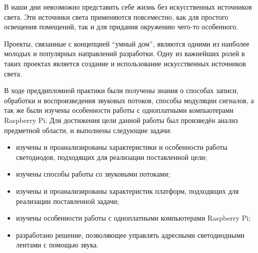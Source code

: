 \conclusion

В наши дни невозможно представить себе жизнь без искусственных источников света. Эти источники света применяются повсеместно, как для простого освещения помещений, так и для придания окружению чего-то особенного.

Проекты, связанные с концепцией ``умный дом'', являются одними из наиболее молодых и популярных направлений разработки. Одну из важнейших ролей в таких проектах является создание и использование искусственных источников света.

В ходе преддипломной практики были получены знания о способах записи, обработки и воспроизведения звуковых потоков, способы модуляции сигналов, а так же были изучены особенности работы с одноплатными компьютерами Raspberry Pi. Для достижения цели данной работы был произведён анализ предметной области, и выполнены следующие задачи:

\begin{itemize}
  \item изучены и проанализированы характеристики и особенности работы светодиодов, подходящих для реализации поставленной цели;
  \item изучены способы работы со звуковыми потоками;
  \item изучены и проанализированы характеристик платформ, подходящих для реализации поставленной задачи;
  \item изучены особенности работы с одноплатными компьютерами Raspberry Pi;
  \item разработано решение, позволяющее управлять адресными светодиодными лентами с помощью звука.
\end{itemize}